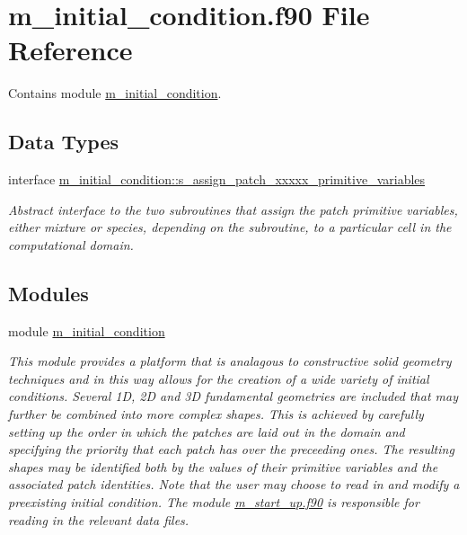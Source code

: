 \hypertarget{m__initial__condition_8f90}{}\section{m\+\_\+initial\+\_\+condition.\+f90 File Reference}
\label{m__initial__condition_8f90}


Contains module \hyperlink{namespacem__initial__condition}{m\+\_\+initial\+\_\+condition}.  


\subsection*{Data Types}
\begin{DoxyCompactItemize}
\item 
interface \hyperlink{interfacem__initial__condition_1_1s__assign__patch__xxxxx__primitive__variables}{m\+\_\+initial\+\_\+condition\+::s\+\_\+assign\+\_\+patch\+\_\+xxxxx\+\_\+primitive\+\_\+variables}
\begin{DoxyCompactList}\small\item\em Abstract interface to the two subroutines that assign the patch primitive variables, either mixture or species, depending on the subroutine, to a particular cell in the computational domain. \end{DoxyCompactList}\end{DoxyCompactItemize}
\subsection*{Modules}
\begin{DoxyCompactItemize}
\item 
module \hyperlink{namespacem__initial__condition}{m\+\_\+initial\+\_\+condition}
\begin{DoxyCompactList}\small\item\em This module provides a platform that is analagous to constructive solid geometry techniques and in this way allows for the creation of a wide variety of initial conditions. Several 1D, 2D and 3D fundamental geometries are included that may further be combined into more complex shapes. This is achieved by carefully setting up the order in which the patches are laid out in the domain and specifying the priority that each patch has over the preceeding ones. The resulting shapes may be identified both by the values of their primitive variables and the associated patch identities. Note that the user may choose to read in and modify a preexisting initial condition. The module \hyperlink{m__start__up_8f90}{m\+\_\+start\+\_\+up.\+f90} is responsible for reading in the relevant data files. \end{DoxyCompactList}\end{DoxyCompactItemize}
